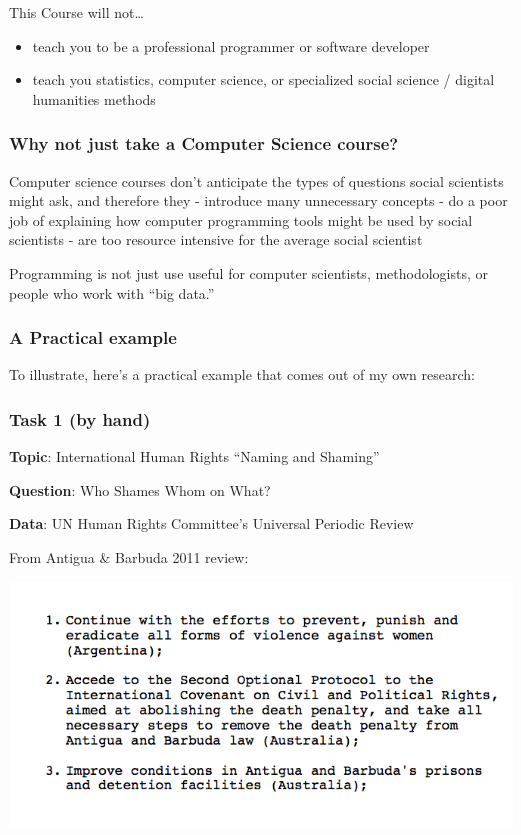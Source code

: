\documentclass[]{book}
\providecommand{\tightlist}{%
  \setlength{\itemsep}{0pt}\setlength{\parskip}{0pt}}
\begin{document}
This Course will not\ldots{}

\begin{itemize}
\tightlist
\item
  teach you to be a professional programmer or software developer
\item
  teach you statistics, computer science, or specialized social science
  / digital humanities methods
\end{itemize}

\subsubsection*{Why not just take a Computer Science
course?}\label{why-not-just-take-a-computer-science-course}

Computer science courses don't anticipate the types of questions social
scientists might ask, and therefore they - introduce many unnecessary
concepts - do a poor job of explaining how computer programming tools
might be used by social scientists - are too resource intensive for the
average social scientist

Programming is not just use useful for computer scientists,
methodologists, or people who work with ``big data.''

\subsubsection*{A Practical example}\label{a-practical-example}

To illustrate, here's a practical example that comes out of my own
research:

\subsubsection*{Task 1 (by hand)}\label{task-1-by-hand}

\textbf{Topic}: International Human Rights ``Naming and Shaming''

\textbf{Question}: Who Shames Whom on What?

\textbf{Data}: UN Human Rights Committee's Universal Periodic Review

From Antigua \& Barbuda 2011 review:

\begin{center}\includegraphics[width=0.7\linewidth]{img/upr-text} \end{center}
\end{document}
